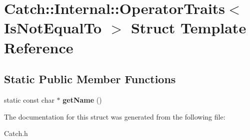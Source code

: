 \hypertarget{struct_catch_1_1_internal_1_1_operator_traits_3_01_is_not_equal_to_01_4}{\section{Catch\-:\-:Internal\-:\-:Operator\-Traits$<$ Is\-Not\-Equal\-To $>$ Struct Template Reference}
\label{struct_catch_1_1_internal_1_1_operator_traits_3_01_is_not_equal_to_01_4}
}
\subsection*{Static Public Member Functions}
\begin{DoxyCompactItemize}
\item 
\hypertarget{struct_catch_1_1_internal_1_1_operator_traits_3_01_is_not_equal_to_01_4_a54a795b8bf7c80a9fdbc7b81f39133b4}{static const char $\ast$ {\bfseries get\-Name} ()}\label{struct_catch_1_1_internal_1_1_operator_traits_3_01_is_not_equal_to_01_4_a54a795b8bf7c80a9fdbc7b81f39133b4}

\end{DoxyCompactItemize}


The documentation for this struct was generated from the following file\-:\begin{DoxyCompactItemize}
\item 
Catch.\-h\end{DoxyCompactItemize}
